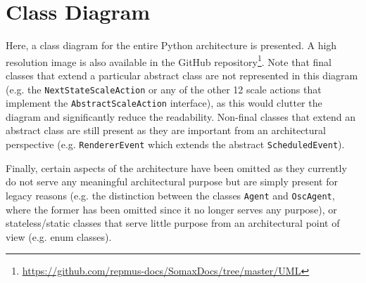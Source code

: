 \chapter{Class Diagram}\label{sec:a-class-diagram}

Here, a class diagram for the entire Python architecture is presented. A high resolution image is also available in the GitHub repository\footnote{\url{https://github.com/repmus-docs/SomaxDocs/tree/master/UML}}. Note that final classes that extend a particular abstract class are not represented in this diagram (e.g. the \texttt{NextStateScaleAction} or any of the other 12 scale actions that implement the \texttt{AbstractScaleAction} interface), as this would clutter the diagram and significantly reduce the readability. Non-final classes that extend an abstract class are still present as they are important from an architectural perspective (e.g. \texttt{RendererEvent} which extends the abstract \texttt{ScheduledEvent}). 

Finally, certain aspects of the architecture have been omitted as they currently do not serve any meaningful architectural purpose but are simply present for legacy reasons (e.g. the distinction between the classes \texttt{Agent} and \texttt{OscAgent}, where the former has been omitted since it no longer serves any purpose), or stateless/static classes that serve little purpose from an architectural point of view (e.g. enum classes). 